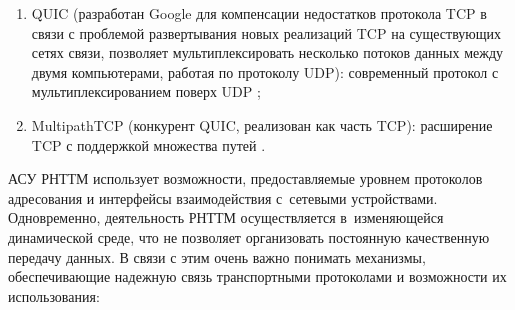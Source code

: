 \begin{itemize}[beginpenalty=10000, midpenalty=10000, wide=\parindent, leftmargin=0pt]
\begin{enumerate}[beginpenalty=10000, midpenalty=10000, wide=\parindent, leftmargin=0pt]
			\item QUIC (разработан Google для компенсации недостатков протокола TCP в связи с проблемой развертывания новых реализаций TCP на существующих сетях связи, позволяет мультиплексировать несколько потоков данных между двумя компьютерами, работая по протоколу UDP):
			современный протокол с мультиплексированием поверх UDP \cite{Olifers};

			\item MultipathTCP (конкурент QUIC, реализован как часть TCP):
			расширение TCP с поддержкой множества путей \cite{ComputerNetwork, habr2023mptcp}.
		\end{enumerate}
\end{itemize}


АСУ РНТТМ использует возможности, предоставляемые уровнем протоколов адресования и интерфейсы взаимодействия с~сетевыми устройствами. Одновременно, деятельность РНТТМ осуществляется в~изменяющейся динамической среде, что не позволяет организовать постоянную качественную передачу данных. В связи с этим очень важно понимать механизмы, обеспечивающие надежную связь транспортными протоколами и возможности их использования:

